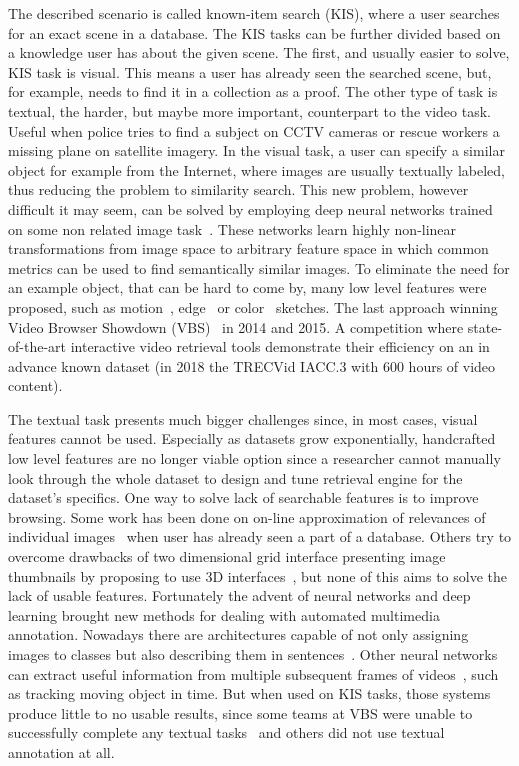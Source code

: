The described scenario is called known-item search (KIS), where a user searches for an exact scene in a database. The KIS tasks can be further divided based on a knowledge user has about the given scene. The first, and usually easier to solve, KIS task is visual. This means a user has already seen the searched scene, but, for example, needs to find it in a collection as a proof. The other type of task is textual, the harder, but maybe more important, counterpart to the video task. Useful when police tries to find a subject on CCTV cameras or rescue workers a missing plane on satellite imagery. In the visual task, a user can specify a similar object for example from the Internet, where images are usually textually labeled, thus reducing the problem to similarity search. This new problem, however difficult it may seem, can be solved by employing deep neural networks trained on some non related image task~\cite{deepFeatures}. These networks learn highly non-linear transformations from image space to arbitrary feature space in which common metrics can be used to find semantically similar images.
To eliminate the need for an example object, that can be hard to come by, many low level features were proposed, such as motion~\cite{motionSketch}, edge~\cite{ITEC2} or color~\cite{sigBrowser} sketches. The last approach winning Video Browser Showdown (VBS)~\cite{cobarzan2017interactive} in 2014 and 2015. A competition where state-of-the-art interactive video retrieval tools demonstrate their efficiency on an in advance known dataset (in 2018 the TRECVid IACC.3 with 600 hours of video content).

The textual task presents much bigger challenges since, in most cases, visual features cannot be used. Especially as datasets grow exponentially, handcrafted low level features are no longer viable option since a researcher cannot manually look through the whole dataset to design and tune retrieval engine for the dataset's specifics. One way to solve lack of searchable features is to improve browsing. Some work has been done on on-line approximation of relevances of individual images~\cite{suditu2011heat} when user has already seen a part of a database. Others try to overcome drawbacks of two dimensional grid interface presenting image thumbnails by proposing to use 3D interfaces~\cite{schoeffmann20143}, but none of this aims to solve the lack of usable features. Fortunately the advent of neural networks and deep learning brought new methods for dealing with automated multimedia annotation. Nowadays there are architectures capable of not only assigning images to classes but also describing them in sentences~\cite{vinyals2017show}. Other neural networks can extract useful information from multiple subsequent frames of videos~\cite{bertinetto2016fully}, such as tracking moving object in time. But when used on KIS tasks, those systems produce little to no usable results, since some teams at VBS were unable to successfully complete any textual tasks~\cite{Lokoc-influential-trends} and others did not use textual annotation at all.

